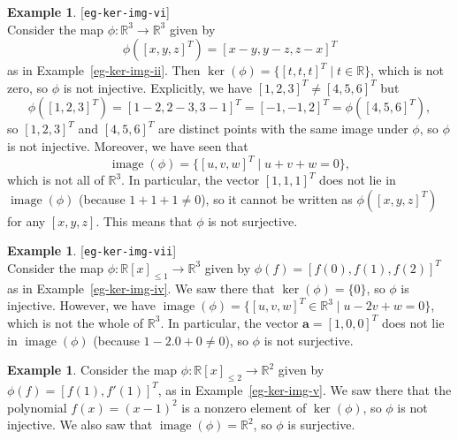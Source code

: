 \documentclass{amsart}
\newcommand{\lbl}[1]{\label{#1}\textup{[\texttt{#1}]}\ \\}
\newcommand{\lbl}{\label}
\newcommand{\R}         {{\mathbb{R}}}
\newcommand{\img}       {\operatorname{image}}
\newcommand{\st}        {\;|\;}
\newcommand{\va}        {\mathbf{a}}
\renewcommand{\:}       {\colon}
\theoremstyle{definition}
\newtheorem{example}[theorem]{Example}
\begin{document}
\begin{example}\lbl{eg-ker-img-vi}
 Consider the map $\phi\:\R^3\to\R^3$ given by 
 \[ \phi([x,y,z]^T)=[x-y,y-z,z-x]^T \]
 as in Example~\ref{eg-ker-img-ii}.  Then 
 $\ker(\phi)=\{[t,t,t]^T\st t\in\R\}$, which is not zero, so $\phi$ is
 not injective.  Explicitly, we have $[1,2,3]^T\neq [4,5,6]^T$ but 
 \[ \phi([1,2,3]^T) = [1-2,2-3,3-1]^T = [-1,-1,2]^T
     = \phi([4,5,6]^T),
 \] 
 so $[1,2,3]^T$ and $[4,5,6]^T$ are distinct points with the same
 image under $\phi$, so $\phi$ is not injective.  Moreover, we have
 seen that 
 \[ \img(\phi) = \{[u,v,w]^T\st u+v+w=0\}, \]
 which is not all of $\R^3$.  In particular, the vector $[1,1,1]^T$
 does not lie in $\img(\phi)$ (because $1+1+1\neq 0$), so it cannot be
 written as $\phi([x,y,z]^T)$ for any $[x,y,z]$.  This means that
 $\phi$ is not surjective.
\end{example}
\begin{example}\lbl{eg-ker-img-vii}
 Consider the map $\phi\:\R[x]_{\leq 1}\to\R^3$ given by
 $\phi(f)=[f(0),f(1),f(2)]^T$ as in Example~\ref{eg-ker-img-iv}.  We
 saw there that $\ker(\phi)=\{0\}$, so $\phi$ is injective.  However,
 we have $\img(\phi)=\{[u,v,w]^T\in\R^3\st u-2v+w=0\}$, which is not
 the whole of $\R^3$.  In particular, the vector $\va=[1,0,0]^T$ does
 not lie in $\img(\phi)$ (because $1-2.0+0\neq 0$), so $\phi$ is not
 surjective. 
\end{example}
\begin{example}
 Consider the map $\phi\:\R[x]_{\leq 2}\to\R^2$ given by
 $\phi(f)=[f(1),f'(1)]^T$, as in Example~\ref{eg-ker-img-v}.  We saw
 there that the polynomial $f(x)=(x-1)^2$ is a nonzero element of
 $\ker(\phi)$, so $\phi$ is not injective.  We also saw that
 $\img(\phi)=\R^2$, so $\phi$ is surjective.
\end{example}
\end{document}
